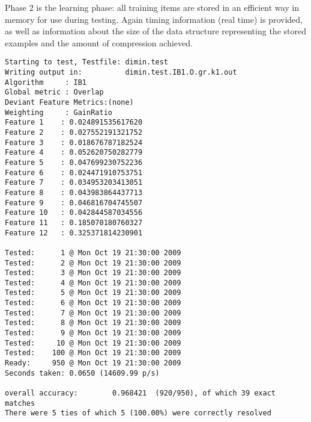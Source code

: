 \documentclass{report}
\begin{document}

Phase 2 is the learning phase: all training items are stored in an
efficient way in memory for use during testing. Again timing
information (real time) is provided, as well as information about the
size of the data structure representing the stored examples and the
amount of compression achieved. 



{\footnotesize
\begin{verbatim}
Starting to test, Testfile: dimin.test
Writing output in:          dimin.test.IB1.O.gr.k1.out
Algorithm     : IB1
Global metric : Overlap
Deviant Feature Metrics:(none)
Weighting     : GainRatio
Feature 1	 : 0.024891535617620
Feature 2	 : 0.027552191321752
Feature 3	 : 0.018676787182524
Feature 4	 : 0.052620750282779
Feature 5	 : 0.047699230752236
Feature 6	 : 0.024471910753751
Feature 7	 : 0.034953203413051
Feature 8	 : 0.043983864437713
Feature 9	 : 0.046816704745507
Feature 10	 : 0.042844587034556
Feature 11	 : 0.185070180760327
Feature 12	 : 0.325371814230901

Tested:      1 @ Mon Oct 19 21:30:00 2009
Tested:      2 @ Mon Oct 19 21:30:00 2009
Tested:      3 @ Mon Oct 19 21:30:00 2009
Tested:      4 @ Mon Oct 19 21:30:00 2009
Tested:      5 @ Mon Oct 19 21:30:00 2009
Tested:      6 @ Mon Oct 19 21:30:00 2009
Tested:      7 @ Mon Oct 19 21:30:00 2009
Tested:      8 @ Mon Oct 19 21:30:00 2009
Tested:      9 @ Mon Oct 19 21:30:00 2009
Tested:     10 @ Mon Oct 19 21:30:00 2009
Tested:    100 @ Mon Oct 19 21:30:00 2009
Ready:     950 @ Mon Oct 19 21:30:00 2009
Seconds taken: 0.0650 (14609.99 p/s)

overall accuracy:        0.968421  (920/950), of which 39 exact matches 
There were 5 ties of which 5 (100.00%) were correctly resolved
\end{verbatim}
}


\end{document}
